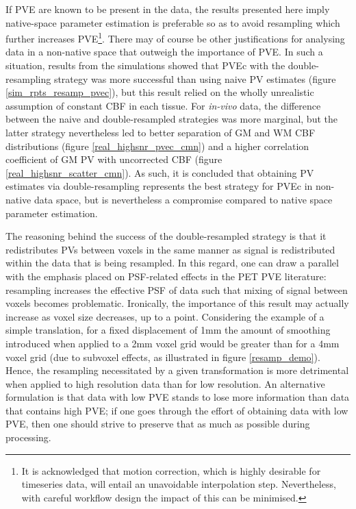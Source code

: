 If PVE are known to be present in the data, the results presented here imply native-space parameter estimation is preferable so as to avoid resampling which further increases PVE\footnote{It is acknowledged that motion correction, which is highly desirable for timeseries data, will entail an unavoidable interpolation step. Nevertheless, with careful workflow design the impact of this can be minimised.}. There may of course be other justifications for analysing data in a non-native space that outweigh the importance of PVE. In such a situation, results from the simulations showed that PVEc with the double-resampling strategy was more successful than using naive PV estimates (figure \ref{sim_rpts_resamp_pvec}), but this result relied on the wholly unrealistic assumption of constant CBF in each tissue. For \textit{in-vivo} data, the difference between the naive and double-resampled strategies was more marginal, but the latter strategy nevertheless led to better separation of GM and WM CBF distributions (figure \ref{real_highsnr_pvec_cmn}) and a higher correlation coefficient of GM PV with uncorrected CBF (figure \ref{real_highsnr_scatter_cmn}). As such, it is concluded that obtaining PV estimates via double-resampling represents the best strategy for PVEc in non-native data space, but is nevertheless a compromise compared to native space parameter estimation. 

The reasoning behind the success of the double-resampled strategy is that it redistributes PVs between voxels in the same manner as signal is redistributed within the data that is being resampled. In this regard, one can draw a parallel with the emphasis placed on PSF-related effects in the PET PVE literature: resampling increases the effective PSF of data such that mixing of signal between voxels becomes problematic. Ironically, the importance of this result may actually increase as voxel size decreases, up to a point. Considering the example of a simple translation, for a fixed displacement of 1mm the amount of smoothing introduced when applied to a 2mm voxel grid would be greater than for a 4mm voxel grid (due to subvoxel effects, as illustrated in figure \ref{resamp_demo}). Hence, the resampling necessitated by a given transformation is more detrimental when applied to high resolution data than for low resolution. An alternative formulation is that data with low PVE stands to lose more information than data that contains high PVE; if one goes through the effort of obtaining data with low PVE, then one should strive to preserve that as much as possible during processing. 


